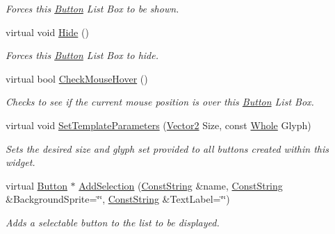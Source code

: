 \begin{DoxyCompactItemize}
\begin{DoxyCompactList}\small\item\em Forces this \hyperlink{classphys_1_1UI_1_1Button}{Button} List Box to be shown. \item\end{DoxyCompactList}\item 
\hypertarget{classphys_1_1UI_1_1ButtonListBox_a679eaa7b269f5fa20db2c1bff6bc2d3b}{
virtual void \hyperlink{classphys_1_1UI_1_1ButtonListBox_a679eaa7b269f5fa20db2c1bff6bc2d3b}{Hide} ()}
\label{d4/dd7/classphys_1_1UI_1_1ButtonListBox_a679eaa7b269f5fa20db2c1bff6bc2d3b}

\begin{DoxyCompactList}\small\item\em Forces this \hyperlink{classphys_1_1UI_1_1Button}{Button} List Box to hide. \item\end{DoxyCompactList}\item 
virtual bool \hyperlink{classphys_1_1UI_1_1ButtonListBox_aaa8b11b174a0475cadee3d3349ef1a58}{CheckMouseHover} ()
\begin{DoxyCompactList}\small\item\em Checks to see if the current mouse position is over this \hyperlink{classphys_1_1UI_1_1Button}{Button} List Box. \item\end{DoxyCompactList}\item 
virtual void \hyperlink{classphys_1_1UI_1_1ButtonListBox_ac14c18e280d1e9fd39a850a9397633e0}{SetTemplateParameters} (\hyperlink{classphys_1_1Vector2}{Vector2} Size, const \hyperlink{namespacephys_a460f6bc24c8dd347b05e0366ae34f34a}{Whole} Glyph)
\begin{DoxyCompactList}\small\item\em Sets the desired size and glyph set provided to all buttons created within this widget. \item\end{DoxyCompactList}\item 
virtual \hyperlink{classphys_1_1UI_1_1Button}{Button} $\ast$ \hyperlink{classphys_1_1UI_1_1ButtonListBox_afc976097cd2b1a039882e07272f9a464}{AddSelection} (\hyperlink{namespacephys_a5ce5049f8b4bf88d6413c47b504ebb31}{ConstString} \&name, \hyperlink{namespacephys_a5ce5049f8b4bf88d6413c47b504ebb31}{ConstString} \&BackgroundSprite=\char`\"{}\char`\"{}, \hyperlink{namespacephys_a5ce5049f8b4bf88d6413c47b504ebb31}{ConstString} \&TextLabel=\char`\"{}\char`\"{})
\begin{DoxyCompactList}\small\item\em Adds a selectable button to the list to be displayed. \item\end{DoxyCompactList}\item 

\end{DoxyCompactItemize}
